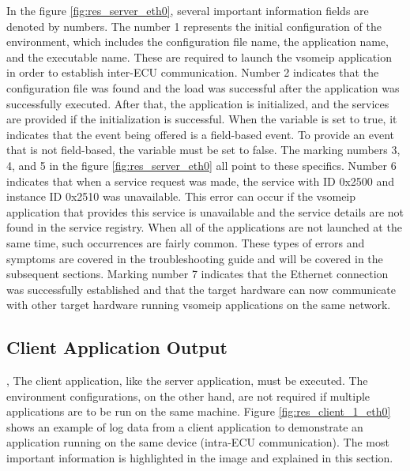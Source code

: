 In the figure \ref{fig:res_server_eth0}, several important information fields are denoted by numbers. The number 1 represents the initial configuration of the environment, which includes the configuration file name, the application name, and the executable name. These are required to launch the vsomeip application in order to establish inter-ECU communication. Number 2 indicates that the configuration file was found and the load was successful after the application was successfully executed. After that, the application is initialized, and the services are provided if the initialization is successful. When the variable  is set to true, it indicates that the event being offered is a field-based event. To provide an event that is not field-based, the variable must be set to false. The marking numbers 3, 4, and 5 in the figure \ref{fig:res_server_eth0} all point to these specifics. Number 6 indicates that when a service request was made, the service with ID 0x2500 and instance ID 0x2510 was unavailable. This error can occur if the vsomeip application that provides this service is unavailable and the service details are not found in the service registry. When all of the applications are not launched at the same time, such occurrences are fairly common. These types of errors and symptoms are covered in the troubleshooting guide and will be covered in the subsequent sections. Marking number 7 indicates that the Ethernet connection was successfully established and that the target hardware can now communicate with other target hardware running vsomeip applications on the same network.

\subsection{Client Application Output},
The client application, like the server application, must be executed. The environment configurations, on the other hand, are not required if multiple applications are to be run on the same machine. Figure \ref{fig:res_client_1_eth0} shows an example of log data from a client application to demonstrate an application running on the same device (intra-ECU communication). The most important information is highlighted in the image and explained in this section.

